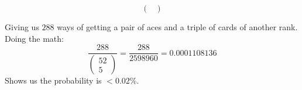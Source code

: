 \documentclass{article}
\begin{document}
\begin{enumerate}[label=\alph*)]
\begin{enumerate}[label=\arabic*.]
\begin{equation*}
\begin{pmatrix}
            \end{pmatrix}
        \end{equation*}
    \end{enumerate}
    Giving us \(288\) ways of getting a pair of aces and a triple of cards of another rank. Doing the math:
    \begin{equation*}
        \frac{288}{
            \begin{pmatrix}
                52 \\
                5
            \end{pmatrix}
        } = \frac{288}{2598960} = 0.0001108136
        \end{equation*}
    Shows us the probability is \(< 0.02\%\).
\end{enumerate}
\end{document}
